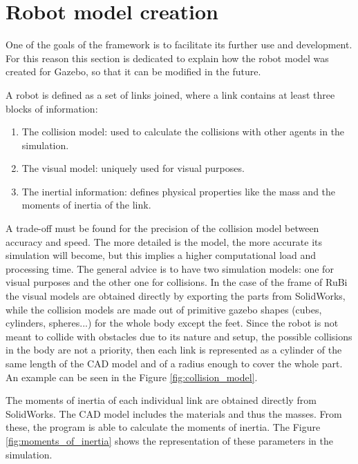 \section{Robot model creation} %
\label{sec:robot_creation}
One of the goals of the framework is to facilitate its further use and development.
For this reason this section is dedicated to explain how the robot model was created for Gazebo, so that it can be modified in the future.

A robot is defined as a set of links joined, where a link contains at least three blocks of information:
\begin{enumerate}
   \item The collision model: used to calculate the collisions with other agents in the simulation.
   \item The visual model: uniquely used for visual purposes.
   \item The inertial information: defines physical properties like the mass and the moments of inertia of the link.
\end{enumerate} 

A trade-off must be found for the precision of the collision model between accuracy and speed.
The more detailed is the model, the more accurate its simulation will become, but this implies a higher computational load and processing time.
The general advice is to have two simulation models: one for visual purposes and the other one for collisions.
In the case of the frame of RuBi the visual models are obtained directly by exporting the parts from SolidWorks, while the collision models are made out of primitive gazebo shapes (cubes, cylinders, spheres...) for the whole body except the feet.
Since the robot is not meant to collide with obstacles due to its nature and setup, the possible collisions in the body are not a priority, then each link is represented as a cylinder of the same length of the CAD model and of a radius enough to cover the whole part.
An example can be seen in the Figure \ref{fig:collision_model}.

The moments of inertia of each individual link are obtained directly from SolidWorks.
The CAD model includes the materials and thus the masses.
From these, the program is able to calculate the moments of inertia.
The Figure \ref{fig:moments_of_inertia} shows the representation of these parameters in the simulation.


